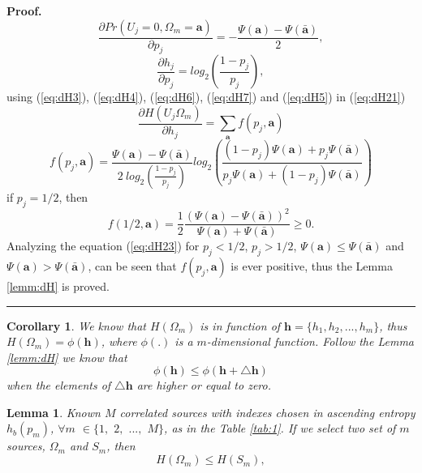 \documentclass[journal]{IEEEtran}
\newtheorem{lemma}[theorem]{Lemma}
\newenvironment{proof}[1][Proof]{\textbf{#1.} }{\ \rule{0.5em}{0.5em}}
\newtheorem{corollary}[theorem]{Corollary}
\begin{document}
\begin{proof}
\begin{equation}
\end{equation}
\begin{equation}\label{eq:dH7}
 \frac{\partial Pr(U_j=0,\Omega_{m}=\mathbf{a})}{\partial p_j}=-\frac{ \Psi(\mathbf{a}) -\Psi(\mathbf{\bar{a}}) }{2},
\end{equation}
\begin{equation}\label{eq:dH5}
 \frac{\partial h_j}{\partial p_j}=log_2 \left( \frac{1-p_j}{p_j}\right),
\end{equation}
using (\ref{eq:dH3}), (\ref{eq:dH4}), (\ref{eq:dH6}), (\ref{eq:dH7}) and (\ref{eq:dH5}) in (\ref{eq:dH21})
\begin{equation}\label{eq:dH22}
\frac{\partial H(U_j\Omega_{m})}{\partial h_j} = \sum \limits_{\mathbf{a}} f(p_j,\mathbf{a})
\end{equation}
\begin{equation}\label{eq:dH23}
f(p_j,\mathbf{a}) = \frac{ \Psi(\mathbf{a}) -\Psi(\mathbf{\bar{a}}) }{2~log_2 \left( \frac{1-p_j}{p_j}\right)} log_2\left( \frac{ (1-p_j)\Psi(\mathbf{a}) + p_j\Psi(\mathbf{\bar{a}}) }{ p_j\Psi(\mathbf{a}) + (1-p_j)\Psi(\mathbf{\bar{a}}) }\right)
\end{equation}
if $p_j=1/2$, then
\begin{equation}\label{eq:dH24}
f(1/2,\mathbf{a}) = \frac{1}{2}\frac{ (\Psi(\mathbf{a}) -\Psi(\mathbf{\bar{a}}))^2 }{\Psi(\mathbf{a}) + \Psi(\mathbf{\bar{a}})} \geq 0.
\end{equation}
Analyzing the equation (\ref{eq:dH23}) for $p_j<1/2$, $p_j>1/2$, 
$\Psi(\mathbf{a}) \leq \Psi(\mathbf{\bar{a}})$ and $\Psi(\mathbf{a}) > \Psi(\mathbf{\bar{a}})$,
can be seen that $f(p_j,\mathbf{a})$ is ever positive, thus the Lemma \ref{lemm:dH} 
is proved.
\end{proof}
\begin{corollary}
 \label{corol:dH}  We know that  $H(\Omega_m)$
is in function of $\mathbf{h}=\{h_1, h_2, ..., h_m\}$, thus 
$H(\Omega_m) = \phi(\mathbf{h})$, where $\phi(.)$ is a $m$-dimensional function.
Follow the Lemma \ref{lemm:dH} we know that
\begin{equation}\label{eq:coro1}
\phi(\mathbf{h}) \leq \phi(\mathbf{h} +  \mathbf{\triangle h}) 
\end{equation}
when the elements of $\mathbf{\triangle h}$ are higher or equal to zero.
\end{corollary}
\begin{lemma}
\label{lemma:minimo2}
Known $M$ correlated sources with indexes chosen in ascending entropy 
$h_b(p_m)$, $\forall m$ $\in \{1,$ $2,$ $...,$ $M\}$, as in the Table \ref{tab:1}.
If we select two set of $m$ sources, $\Omega_m$ and $S_m$,
then
\begin{equation}
H(\Omega_m) \leq H(S_m),
\end{equation}
\end{lemma}
\end{document}
